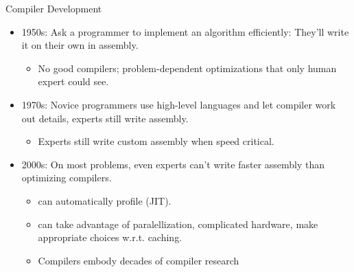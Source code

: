 \begin{frame}{Compiler Development}
  \begin{itemize}
    \item 1950s: Ask a programmer to implement an algorithm efficiently:  They'll write it on their own in assembly.
    \begin{itemize}
      \item No good compilers; problem-dependent optimizations that only human expert could see.
    \end{itemize}
    \vspace{\baselineskip}
    \item 1970s: Novice programmers use high-level languages and let compiler work out details, experts still write assembly.
    \begin{itemize}
      \item Experts still write custom assembly when speed critical.
    \end{itemize}
    \vspace{\baselineskip}
    \item 2000s: On most problems, even experts can't write faster assembly than optimizing compilers.
    \begin{itemize}
      \item can automatically profile (JIT).
      \item can take advantage of paralellization, complicated hardware, make appropriate choices w.r.t. caching.
      \item Compilers embody decades of compiler research
    \end{itemize}    
    \vspace{\baselineskip}
  \end{itemize}
\end{frame}


